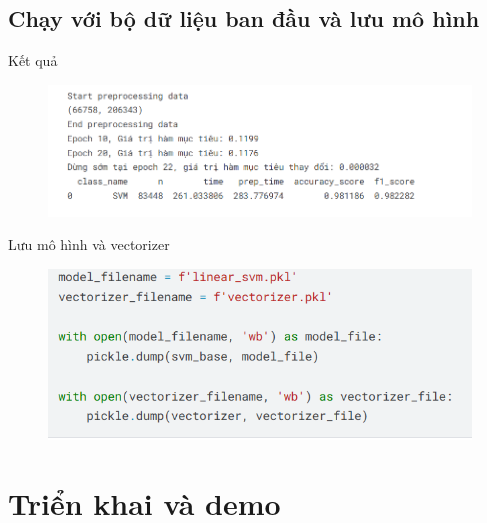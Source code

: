 \documentclass[serif, aspectratio=169]{beamer}
\begin{document}
	\subsection{Chạy với bộ dữ liệu ban đầu và lưu mô hình}
	\begin{frame}{Kết quả}
		\begin{figure}
			\centering
			\includegraphics[width=1\linewidth]{pic/svm-pegasos-result-full.png}
			\label{fig:svm-pegasos-result-full}
		\end{figure}
	\end{frame}
	
	\begin{frame}{Lưu mô hình và vectorizer}
		\begin{figure}
			\centering
			\includegraphics[width=1\linewidth]{pic/save-model-vectorizer.png}
			\label{fig:save-model-vectorizer}
		\end{figure}
	\end{frame}
	
	
	
	\section{Triển khai và demo}
\end{document}
